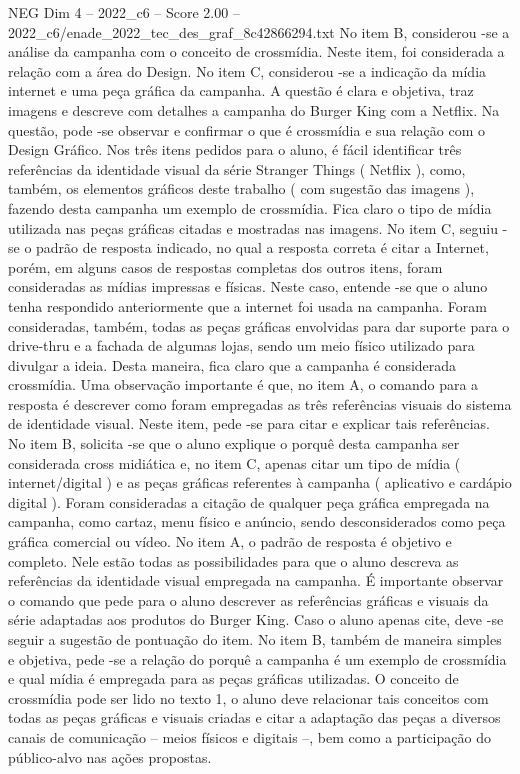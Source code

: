 \begin{textsample}{NEG Dim 4 – 2022\_c6 – Score 2.00 – 2022\_c6/enade\_2022\_tec\_des\_graf\_8c42866294.txt}
No item B, considerou -se a análise da campanha com o conceito de crossmídia.
Neste item, foi considerada a relação com a área do Design.
No item C, considerou -se a indicação da mídia internet e uma peça gráfica da campanha.
A questão é clara e objetiva, traz imagens e descreve com detalhes a campanha do Burger King com a Netflix.
Na questão, pode -se observar e confirmar o que é crossmídia e sua relação com o Design Gráfico.
Nos três itens pedidos para o aluno, é fácil identificar três referências da identidade visual da série Stranger Things ( Netflix ), como, também, os elementos gráficos deste trabalho ( com sugestão das imagens ), fazendo desta campanha um exemplo de crossmídia.
Fica claro o tipo de mídia utilizada nas peças gráficas citadas e mostradas nas imagens.
No item C, seguiu -se o padrão de resposta indicado, no qual a resposta correta é citar a Internet, porém, em alguns casos de respostas completas dos outros itens, foram consideradas as mídias impressas e físicas.
Neste caso, entende -se que o aluno tenha respondido anteriormente que a internet foi usada na campanha.
Foram consideradas, também, todas as peças gráficas envolvidas para dar suporte para o drive-thru e a fachada de algumas lojas, sendo um meio físico utilizado para divulgar a ideia.
Desta maneira, fica claro que a campanha é considerada crossmídia.
Uma observação importante é que, no item A, o comando para a resposta é descrever como foram empregadas as três referências visuais do sistema de identidade visual.
Neste item, pede -se para citar e explicar tais referências.
No item B, solicita -se que o aluno explique o porquê desta campanha ser considerada cross midiática e, no item C, apenas citar um tipo de mídia ( internet/digital ) e as peças gráficas referentes à campanha ( aplicativo e cardápio digital ).
Foram consideradas a citação de qualquer peça gráfica empregada na campanha, como cartaz, menu físico e anúncio, sendo desconsiderados como peça gráfica comercial ou vídeo.
No item A, o padrão de resposta é objetivo e completo.
Nele estão todas as possibilidades para que o aluno descreva as referências da identidade visual empregada na campanha.
É importante observar o comando que pede para o aluno descrever as referências gráficas e visuais da série adaptadas aos produtos do Burger King.
Caso o aluno apenas cite, deve -se seguir a sugestão de pontuação do item.
No item B, também de maneira simples e objetiva, pede -se a relação do porquê a campanha é um exemplo de crossmídia e qual mídia é empregada para as peças gráficas utilizadas.
O conceito de crossmídia pode ser lido no texto 1, o aluno deve relacionar tais conceitos com todas as peças gráficas e visuais criadas e citar a adaptação das peças a diversos canais de comunicação – meios físicos e digitais –, bem como a participação do público-alvo nas ações propostas.

\end{textsample}
